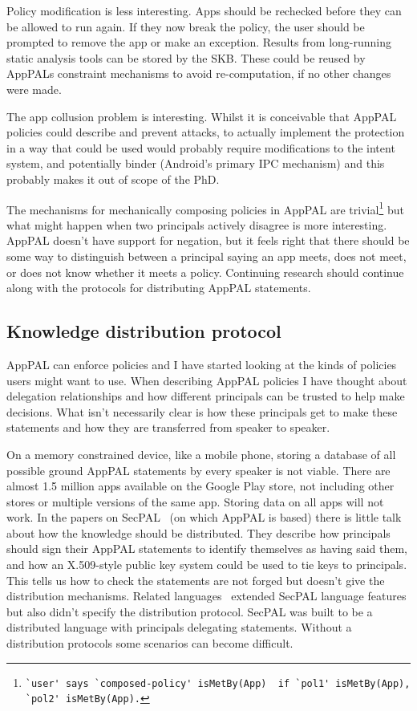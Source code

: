 \documentclass[a4paper]{scrartcl}
\begin{document}
Policy modification is less interesting.
Apps should be rechecked before they can be allowed to run again.
If they now break the policy, the user should be prompted to remove the app or make an exception.
Results from long-running static analysis tools can be stored by the \ac{SKB}.
These could be reused by AppPALs constraint mechanisms to avoid re-computation, if no other changes were made.

The app collusion problem is interesting.
Whilst it is conceivable that AppPAL policies could describe and prevent attacks, to actually implement the protection in a way that could be used would probably require modifications to the intent system, and potentially binder (Android's primary IPC mechanism) and this probably makes it out of scope of the PhD.

The mechanisms for mechanically composing policies in AppPAL are trivial\footnote{\lstinline{`user' says `composed-policy' isMetBy(App)  if `pol1' isMetBy(App), `pol2' isMetBy(App).}} but what might happen when two principals actively disagree is more interesting.
AppPAL doesn't have support for negation, but it feels right that there should be some way to distinguish between a principal saying an app meets, does not meet, or does not know whether it meets a policy.
Continuing research should continue along with the protocols for distributing AppPAL statements.

\subsection{Knowledge distribution protocol}
\label{ssec:kdp}

AppPAL can enforce policies and I have started looking at the kinds of policies users might want to use.
When describing AppPAL policies I have thought about delegation relationships and how different principals can be trusted to help make decisions.
What isn't necessarily clear is how these principals get to make these statements and how they are transferred from speaker to speaker.

On a memory constrained device, like a mobile phone, storing a database of all possible ground AppPAL statements by every speaker is not viable.
There are almost 1.5 million apps available on the Google Play store, not including other stores or multiple versions of the same app.
Storing data on all apps will not work.
In the papers on SecPAL~\citep{Becker:2006vh,Becker:2009vt} (on which AppPAL is based) there is little talk about how the knowledge should be distributed.
They describe how principals should sign their AppPAL statements to identify themselves as having said them, and how an X.509-style public key system could be used to tie keys to principals.  This tells us how to check the statements are not forged but doesn't give the distribution mechanisms.
Related languages~\citep{Becker:2009ula,Aziz:2011vt,Gurevich:2008fz,Gurevich:Qo5E3M3} extended SecPAL language features but also didn't specify the distribution protocol.
SecPAL was built to be a distributed language with principals delegating statements.
Without a distribution protocols some scenarios can become difficult.
\end{document}
